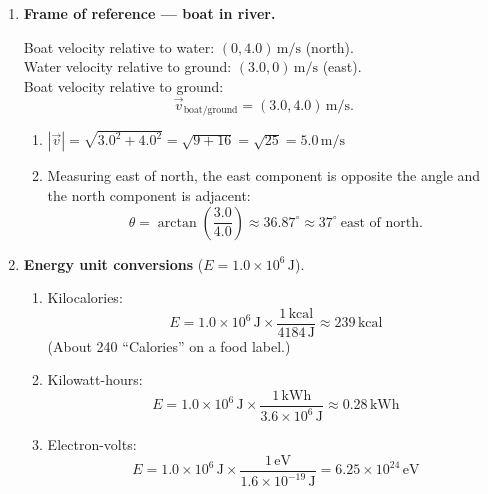 \documentclass[12pt, twoside]{article}
\begin{document}
\begin{enumerate}
\newpage

\item \textbf{Frame of reference --- boat in river.}

Boat velocity relative to water: $(0, 4.0)\,\text{m/s}$ (north). \\
Water velocity relative to ground: $(3.0, 0)\,\text{m/s}$ (east). \\
Boat velocity relative to ground:
\[
\vec{v}_{\text{boat/ground}} = (3.0, 4.0)\,\text{m/s}.
\]

\begin{enumerate}
\item $|\vec{v}| = \sqrt{3.0^2 + 4.0^2} = \sqrt{9 + 16} = \sqrt{25} = \boxed{5.0\,\text{m/s}}$

\item Measuring east of north, the east component is opposite the angle and the north component is adjacent:
\[
\theta = \arctan\!\left(\dfrac{3.0}{4.0}\right) \approx 36.87^\circ \approx \boxed{37^\circ}\ \text{east of north.}
\]
\end{enumerate}

\vspace{0.8cm}

\item \textbf{Energy unit conversions} ($E = 1.0\times 10^{6}\,\text{J}$).

\begin{enumerate}
\item Kilocalories:
\[
E = 1.0\times 10^{6}\,\text{J} \times \dfrac{1\,\text{kcal}}{4184\,\text{J}} \approx \boxed{239\,\text{kcal}}
\]
(About 240 ``Calories'' on a food label.)

\item Kilowatt-hours:
\[
E = 1.0\times 10^{6}\,\text{J} \times \dfrac{1\,\text{kWh}}{3.6\times 10^{6}\,\text{J}} \approx \boxed{0.28\,\text{kWh}}
\]

\item Electron-volts:
\[
E = 1.0\times 10^{6}\,\text{J} \times \dfrac{1\,\text{eV}}{1.6\times 10^{-19}\,\text{J}} = \boxed{6.25\times 10^{24}\,\text{eV}}
\]
\end{enumerate}

\end{enumerate}
\end{document}
